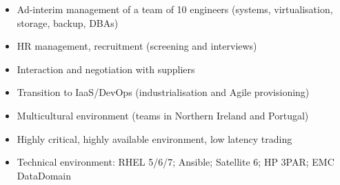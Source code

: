 \documentclass[10pt,a4paper]{altacv}
\begin{document}

\begin{fullwidth}
\makecvheader
\end{fullwidth}


\begin{itemize}
\item Ad-interim management of a team of 10 engineers (systems, virtualisation, storage, backup, DBAs)
\item HR management, recruitment (screening and interviews)
\item Interaction and negotiation with suppliers
\item Transition to IaaS/DevOps (industrialisation and Agile provisioning)
\item Multicultural environment (teams in Northern Ireland and Portugal)
\item Highly critical, highly available environment, low latency trading
\item Technical environment: RHEL 5/6/7; Ansible; Satellite 6; HP 3PAR; EMC DataDomain
\end{itemize}

\divider
\end{document}
